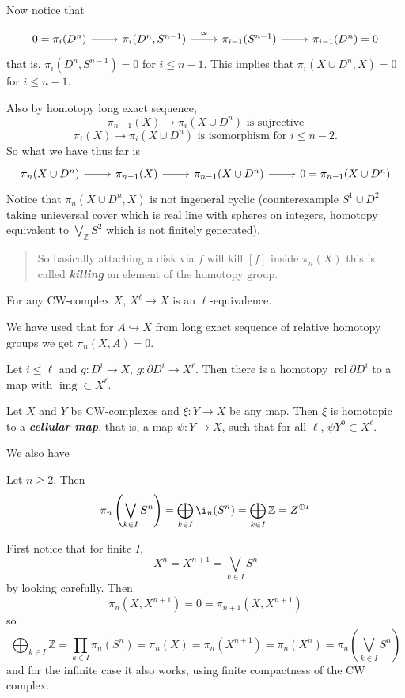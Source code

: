\documentclass{article}
\newcommand{\Z}{\mathbb{Z}}
\DeclareMathOperator{\img}{img}
\DeclareMathOperator{\rel}{rel}
\begin{document}
Now notice that

\[\begin{tikzcd}
	0=\pi_i(D^n)\arrow[r]&\pi_i(D^n,S^{n-1})\arrow[r,"\cong"]&\pi_{i-1}(S^{n-1})\arrow[r]&\pi_{i-1}(D^n)=0
\end{tikzcd}\]
that is, $\pi_i(D^n,S^{n-1})=0$ for $i\leq n-1$. This implies that $\pi_i(X\cup D^n,X)=0$ for $i\leq n-1$.

Also by homotopy long exact sequence,
\[\pi_{n-1}(X)\to \pi_i(X\cup D^n)\text{ is sujrective}\]
\[\pi_i(X)\to \pi_{i}(X\cup D^n)\text{ is isomorphism for }i\leq n-2.\]
So what we have thus far is
\[\begin{tikzcd}
	\pi_n(X\cup D^n)\arrow[r]&\pi_{n-1}(X)\arrow[r]&\pi_{n-1}(X\cup D^n)\arrow[r]&0=\pi_{n-1}(X\cup D^n)
\end{tikzcd}\]
Notice that $\pi_n(X\cup D^n,X)$ is not ingeneral cyclic (counterexample $S^1\cup D^2$ taking unieversal cover which is real line with spheres on integers, homotopy equivalent to $\bigvee_\Z S^2$ which is not finitely generated).

\begin{quote}
	{\color{red} So basically attaching a disk via $f$ will kill $[f]$ inside $\pi_n(X)$ this is called \textbf{\textit{killing}} an element of the homotopy group.}
\end{quote}

\begin{prop}
	For any CW-complex $X$, $X^\ell\to X$ is an $\ell$-equivalence.
\end{prop}
\begin{remark}
	We have used that for $A\hookrightarrow X$ from long exact sequence of relative homotopy groups we get $\pi_n(X,A)=0$.
\end{remark}
\begin{coro}
	Let $i\leq \ell$ and $g: D^i\to X$, $g:\partial D^i\to X^\ell$. Then there is a homotopy $\rel\partial D^i$ to a map with $\img\subset X^\ell$.
\end{coro}
\begin{thm}
	Let $X$ and $Y$ be CW-complexes and $\xi:Y\to X$ be any map. Then $\xi$ is homotopic to a \textbf{\textit{cellular map}}, that is, a map $\psi:Y\to X$, such that for all $\ell$, $\psi Y^0\subset X^\ell$.
\end{thm}

We also have
\begin{prop}
	Let $n\geq 2$. Then 
	\[\pi_n\left(\bigvee_{k\in I}S^n\right)=\bigoplus_{k\in I}\i_n(S^n)=\bigoplus_{k\in I}\Z=Z^{\oplus I}\]
\end{prop}
\begin{prop}
	First notice that for finite $I$,
	\[X^n=X^{n+1}=\bigvee_{k\in I}S^n\]
	by looking carefully. Then
	\[\pi_n(X,X^{n+1})=0=\pi_{n+1}(X,X^{n+1})\]
	so
	\[\bigoplus_{k\in I}\Z=\prod_{k\in I}\pi_n(S^n)=\pi_n(X)=\pi_n(X^{n+1})=\pi_n(X^n)=\pi_n\left(\bigvee_{k\in I}S^n\right)\]
	and for the infinite case it also works, using finite compactness of the CW complex.
\end{prop}
\end{document}
